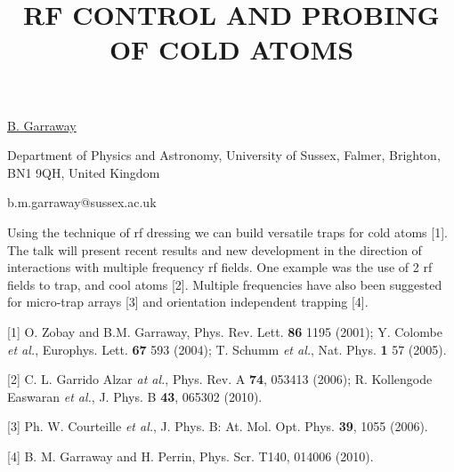 \title{RF CONTROL AND PROBING OF COLD ATOMS}

\underline{B. Garraway} 

{\normalsize{\vspace{-4mm}
Department of Physics and Astronomy, University of Sussex, Falmer,
Brighton, BN1 9QH, United Kingdom

\email b.m.garraway@sussex.ac.uk}}

Using the technique of rf dressing we can
build versatile traps for cold atoms [1]. The talk will
present recent results and new development in the
direction of interactions with multiple frequency rf
fields. One example was the use of 2 rf fields to trap,
and cool atoms [2]. Multiple frequencies have also been
suggested for micro-trap arrays [3] and orientation
independent trapping [4].

{\normalsize
[1] O. Zobay and B.M. Garraway, Phys. Rev. Lett. \textbf{86} 1195 (2001);
Y. Colombe \textit{et al.}, Europhys. Lett. \textbf{67} 593 (2004);
T. Schumm \textit{et al.}, Nat. Phys. \textbf{1} 57 (2005).
\vsp

[2] C. L. Garrido Alzar \textit{at al.}, Phys. Rev. A \textbf{74}, 053413 (2006);
R. Kollengode Easwaran \textit{et al.}, J. Phys. B \textbf{43}, 065302 (2010).
\vsp

[3] Ph. W. Courteille \textit{et al.}, J. Phys. B: At. Mol. Opt. Phys. \textbf{39}, 1055 (2006).
\vsp

[4] B. M. Garraway and H. Perrin, Phys. Scr. T140, 014006 (2010).
}

\vspace{\baselineskip} 